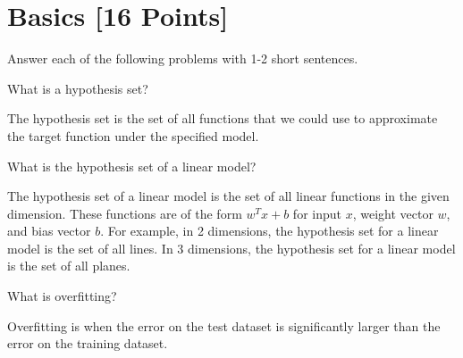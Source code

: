 





\newpage
\section{Basics [16 Points]}

Answer each of the following problems with 1-2 short sentences.

\begin{problem}[2]
  What is a hypothesis set?
\end{problem}
\begin{solution}
  The hypothesis set is the set of all functions that we could use to approximate the target function under the specified model.
\end{solution}

\begin{problem}[2]
  What is the hypothesis set of a linear model?
\end{problem}
\begin{solution}
  The hypothesis set of a linear model is the set of all linear functions in the given dimension. These functions are of the form $w^T x + b$ for input $x$, weight vector $w$, and bias vector $b$. For example, in 2 dimensions, the hypothesis set for a linear model is the set of all lines. In 3 dimensions, the hypothesis set for a linear model is the set of all planes.
\end{solution}

\begin{problem}[2]
  What is overfitting?
\end{problem}
\begin{solution}
  Overfitting is when the error on the test dataset is significantly larger than the error on the training dataset.
\end{solution}

